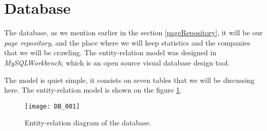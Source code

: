 \section{Database}

The database, as we mention earlier in the section \ref{pageRepository}, it will be our \emph{page repository}, and the place where we will keep statistics and the companies that we will be crawling. The entity-relation model was designed in \emph{MySQLWorkbench}; which is an open source visual database design tool. 

The model is quiet simple, it consists on seven tables that we will be discussing here. The entity-relation model is shown on the figure \ref{fig:DB_001}.

	\begin{figure}\centering
		\texttt{[image: DB\_001]}
		\caption{Entity-relation diagram of the database.}\label{fig:DB_001}
	\end{figure}

